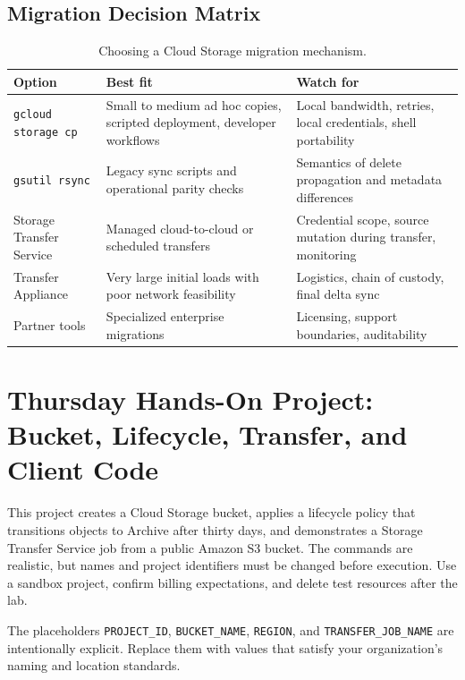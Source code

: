 \subsection{Migration Decision Matrix}
\begin{table}[H]
\centering
\small
\begin{tabular}{@{}p{3.1cm}p{4.7cm}p{4.9cm}@{}}
\toprule
\textbf{Option} & \textbf{Best fit} & \textbf{Watch for} \\
\midrule
\texttt{gcloud storage cp} & Small to medium ad hoc copies, scripted deployment, developer workflows & Local bandwidth, retries, local credentials, shell portability \\
\texttt{gsutil rsync} & Legacy sync scripts and operational parity checks & Semantics of delete propagation and metadata differences \\
Storage Transfer Service & Managed cloud-to-cloud or scheduled transfers & Credential scope, source mutation during transfer, monitoring \\
Transfer Appliance & Very large initial loads with poor network feasibility & Logistics, chain of custody, final delta sync \\
Partner tools & Specialized enterprise migrations & Licensing, support boundaries, auditability \\
\bottomrule
\end{tabular}
\caption{Choosing a Cloud Storage migration mechanism.}
\label{tab:migration-matrix}
\end{table}

\section{Thursday Hands-On Project: Bucket, Lifecycle, Transfer, and Client Code}
This project creates a Cloud Storage bucket, applies a lifecycle policy that transitions objects to Archive after thirty days, and demonstrates a Storage Transfer Service job from a public Amazon S3 bucket. The commands are realistic, but names and project identifiers must be changed before execution. Use a sandbox project, confirm billing expectations, and delete test resources after the lab.

\begin{notebox}
The placeholders \texttt{PROJECT\_ID}, \texttt{BUCKET\_NAME}, \texttt{REGION}, and \texttt{TRANSFER\_JOB\_NAME} are intentionally explicit. Replace them with values that satisfy your organization's naming and location standards.
\end{notebox}

